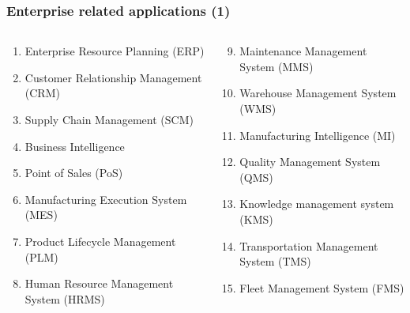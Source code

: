 \documentclass[aspectratio=169, table]{beamer}
\begin{document}
\begin{frame}
    \frametitle{Enterprise related applications (1)}
    \vspace{20pt}
    \begin{columns}
        \begin{column}{0.5\textwidth}
            \begin{enumerate}
                \item Enterprise Resource Planning (ERP)
                \item Customer Relationship Management (CRM)
                \item Supply Chain Management (SCM)
                \item Business Intelligence
                \item Point of Sales (PoS)
                \item Manufacturing Execution System (MES)
                \item Product Lifecycle Management (PLM)
                \item Human Resource Management System (HRMS)
            \end{enumerate}
        \end{column}
        \begin{column}{0.5\textwidth}
            \begin{enumerate}
                \setcounter{enumi}{8}
                \item Maintenance Management System (MMS)
                \item Warehouse Management System (WMS)
                \item Manufacturing Intelligence (MI)
                \item Quality Management System (QMS)
                \item Knowledge management system (KMS)
                \item Transportation Management System (TMS)
                \item Fleet Management System (FMS)
            \end{enumerate}
        \end{column}
    \end{columns}
\end{frame}
\end{document}
